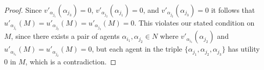 \begin{proof}
Since $\mathit{v'}_{\alpha_{j_1}}(\alpha_{j_3})=0$, $\mathit{v'}_{\alpha_{j_2}}(\alpha_{j_1})=0$, and $\mathit{v'}_{\alpha_{j_2}}(\alpha_{j_3})=0$ it follows that $u'_{\alpha_{j_1}}(M)=u'_{\alpha_{j_2}}(M)=u'_{\alpha_{j_3}}(M)=0$. This violates our stated condition on $M$, since there exists a pair of agents $\alpha_{i_1}, \alpha_{j_2} \in N$ where $\mathit{v'}_{\alpha_{i_1}}(\alpha_{j_2})$ and $u'_{\alpha_{i_1}}(M)=u'_{\alpha_{j_2}}(M)=0$, but each agent in the triple $\{ \alpha_{j_1}, \alpha_{j_2}, \alpha_{j_3} \}$ has utility $0$ in $M$, which is a contradiction.
\end{proof}